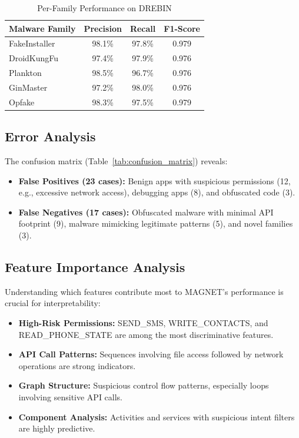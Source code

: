 \documentclass[10pt,conference]{IEEEtran}
\begin{document}
\begin{table}[!t]
    \centering
    \caption{Per-Family Performance on DREBIN}
    \label{tab:family_performance}
    \begin{threeparttable}
        \begin{tabular}{lccc}
            \toprule
            \textbf{Malware Family} & \textbf{Precision} & \textbf{Recall} & \textbf{F1-Score} \\
            \midrule
            FakeInstaller & 98.1\% & 97.8\% & 0.979 \\
            DroidKungFu & 97.4\% & 97.9\% & 0.976 \\
            Plankton & 98.5\% & 96.7\% & 0.976 \\
            GinMaster & 97.2\% & 98.0\% & 0.976 \\
            Opfake & 98.3\% & 97.5\% & 0.979 \\
            \bottomrule
        \end{tabular}
    \end{threeparttable}
\end{table}

\subsection{Error Analysis}
The confusion matrix (Table~\ref{tab:confusion_matrix}) reveals:
\begin{itemize}
    \item \textbf{False Positives (23 cases):} Benign apps with suspicious permissions (12, e.g., excessive network access), debugging apps (8), and obfuscated code (3).
    \item \textbf{False Negatives (17 cases):} Obfuscated malware with minimal API footprint (9), malware mimicking legitimate patterns (5), and novel families (3).
\end{itemize}

\subsection{Feature Importance Analysis}
Understanding which features contribute most to MAGNET's performance is crucial for interpretability:

\begin{itemize}
    \item \textbf{High-Risk Permissions:} SEND\_SMS, WRITE\_CONTACTS, and READ\_PHONE\_STATE are among the most discriminative features.
    \item \textbf{API Call Patterns:} Sequences involving file access followed by network operations are strong indicators.
    \item \textbf{Graph Structure:} Suspicious control flow patterns, especially loops involving sensitive API calls.
    \item \textbf{Component Analysis:} Activities and services with suspicious intent filters are highly predictive.
\end{itemize}
\end{document}
